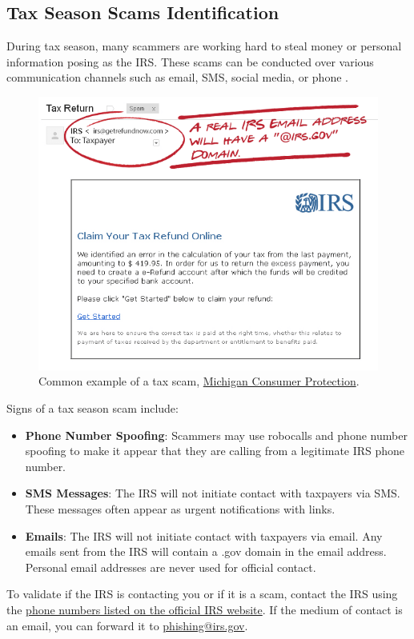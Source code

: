 \begin{fullwidth}
\subsection{Tax Season Scams Identification} %

During tax season, many scammers are working hard to steal money or personal information posing as the IRS. These scams can be conducted over various communication channels such as email, SMS, social media, or phone \autocite{FCC:2023}.

\begin{figure}[H] %
    \centering
    \includegraphics[width=.75\linewidth]{assets/example_tax_scam.png}
    \captionsetup{justification=centering}
    \caption{Common example of a tax scam, \href{https://www.michigan.gov/consumerprotection/protect-yourself/consumer-alerts/scams/irs-phone-email-tax}{Michigan Consumer Protection}.}
\end{figure}

Signs of a tax season scam include:
\begin{itemize}
    \item \textbf{Phone Number Spoofing}: Scammers may use robocalls and phone number spoofing to make it appear that they are calling from a legitimate IRS phone number.
    \item \textbf{SMS Messages}: The IRS will not initiate contact with taxpayers via SMS. These messages often appear as urgent notifications with links.
    \item \textbf{Emails}: The IRS will not initiate contact with taxpayers via email. Any emails sent from the IRS will contain a .gov domain in the email address. Personal email addresses are never used for official contact.
\end{itemize}
To validate if the IRS is contacting you or if it is a scam, contact the IRS using the \href{https://www.irs.gov/help/let-us-help-you}{phone numbers listed on the official IRS website}. If the medium of contact is an email, you can forward it to \href{mailto:phishing@irs.gov}{phishing@irs.gov}.

\end{fullwidth}